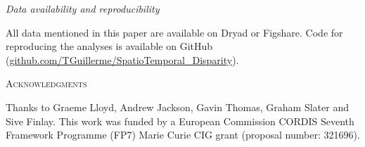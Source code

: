 \documentclass[12pt,letterpaper]{article}
\renewcommand{\section}[1]{%
\bigskip
\begin{center}
\begin{Large}
\normalfont\scshape #1
\medskip
\end{Large}
\end{center}}
\renewcommand{\subsection}[1]{%
\bigskip
\begin{center}
\begin{large}
\normalfont\itshape #1
\end{large}
\end{center}}
\begin{document}
\subsection{Data availability and reproducibility}
All data mentioned in this paper are available on Dryad or Figshare. %
Code for reproducing the analyses is available on GitHub (\url{github.com/TGuillerme/SpatioTemporal_Disparity}).

\section{Acknowledgments}
Thanks to Graeme Lloyd, Andrew Jackson, Gavin Thomas, Graham Slater and Sive Finlay.
This work was funded by a European Commission CORDIS Seventh Framework Programme (FP7) Marie Curie CIG grant (proposal number: 321696).
\end{document}
